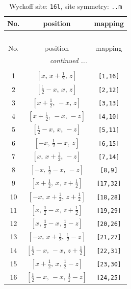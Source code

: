 \documentclass[fleqn,8pt]{jsarticle}
\begin{document}
\renewcommand{\arraystretch}{1.2}
\begin{longtable}{ccc}
\caption{Wyckoff site: {\tt 16l}, site symmetry: {\tt ..m}}
 \\
 \hline \hline
No. & position & mapping \\ \hline \endfirsthead

\multicolumn{2}{l}{\tablename\ \thetable{}} \\
 \hline \hline
No. & position & mapping \\ \hline \endhead

 \hline \hline
\multicolumn{2}{r}{\footnotesize\it continued ...} \\ \endfoot

 \hline \hline
\multicolumn{2}{r}{} \\ \endlastfoot

1 & $\left[ x,\, x + \frac{1}{2},\, z \right]$ & {\tt [1,16]} \\ \hline
2 & $\left[ \frac{1}{2} - x,\, x,\, z \right]$ & {\tt [2,12]} \\ \hline
3 & $\left[ x + \frac{1}{2},\, - x,\, z \right]$ & {\tt [3,13]} \\ \hline
4 & $\left[ x + \frac{1}{2},\, - x,\, - z \right]$ & {\tt [4,10]} \\ \hline
5 & $\left[ \frac{1}{2} - x,\, x,\, - z \right]$ & {\tt [5,11]} \\ \hline
6 & $\left[ - x,\, \frac{1}{2} - x,\, z \right]$ & {\tt [6,15]} \\ \hline
7 & $\left[ x,\, x + \frac{1}{2},\, - z \right]$ & {\tt [7,14]} \\ \hline
8 & $\left[ - x,\, \frac{1}{2} - x,\, - z \right]$ & {\tt [8,9]} \\ \hline
9 & $\left[ x + \frac{1}{2},\, x,\, z + \frac{1}{2} \right]$ & {\tt [17,32]} \\ \hline
10 & $\left[ - x,\, x + \frac{1}{2},\, z + \frac{1}{2} \right]$ & {\tt [18,28]} \\ \hline
11 & $\left[ x,\, \frac{1}{2} - x,\, z + \frac{1}{2} \right]$ & {\tt [19,29]} \\ \hline
12 & $\left[ x,\, \frac{1}{2} - x,\, \frac{1}{2} - z \right]$ & {\tt [20,26]} \\ \hline
13 & $\left[ - x,\, x + \frac{1}{2},\, \frac{1}{2} - z \right]$ & {\tt [21,27]} \\ \hline
14 & $\left[ \frac{1}{2} - x,\, - x,\, z + \frac{1}{2} \right]$ & {\tt [22,31]} \\ \hline
15 & $\left[ x + \frac{1}{2},\, x,\, \frac{1}{2} - z \right]$ & {\tt [23,30]} \\ \hline
16 & $\left[ \frac{1}{2} - x,\, - x,\, \frac{1}{2} - z \right]$ & {\tt [24,25]} \\
\end{longtable}
\end{document}
